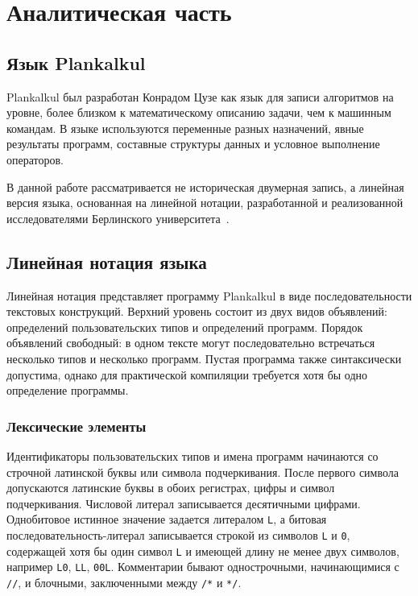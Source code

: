 \chapter{Аналитическая часть}

\section{Язык Plankalkul}
Plankalkul был разработан Конрадом Цузе как язык для записи алгоритмов на уровне, более близком к математическому описанию задачи, чем к машинным командам.
В языке используются переменные разных назначений, явные результаты программ, составные структуры данных и условное выполнение операторов.

В данной работе рассматривается не историческая двумерная запись, а линейная версия языка, основанная на линейной нотации, разработанной и реализованной исследователями Берлинского университета~\cite{berlin-notation}.

\section{Линейная нотация языка}
Линейная нотация представляет программу Plankalkul в виде последовательности текстовых конструкций.
Верхний уровень состоит из двух видов объявлений: определений пользовательских типов и определений программ.
Порядок объявлений свободный: в одном тексте могут последовательно встречаться несколько типов и несколько программ.
Пустая программа также синтаксически допустима, однако для практической компиляции требуется хотя бы одно определение программы.

\subsection{Лексические элементы}
Идентификаторы пользовательских типов и имена программ начинаются со строчной латинской буквы или символа подчеркивания.
После первого символа допускаются латинские буквы в обоих регистрах, цифры и символ подчеркивания.
Числовой литерал записывается десятичными цифрами.
Однобитовое истинное значение задается литералом \texttt{L}, а битовая последовательность-литерал записывается строкой из символов \texttt{L} и \texttt{0}, содержащей хотя бы один символ \texttt{L} и имеющей длину не менее двух символов, например \texttt{L0}, \texttt{LL}, \texttt{00L}.
Комментарии бывают однострочными, начинающимися с \texttt{//}, и блочными, заключенными между \texttt{/*} и \texttt{*/}.


